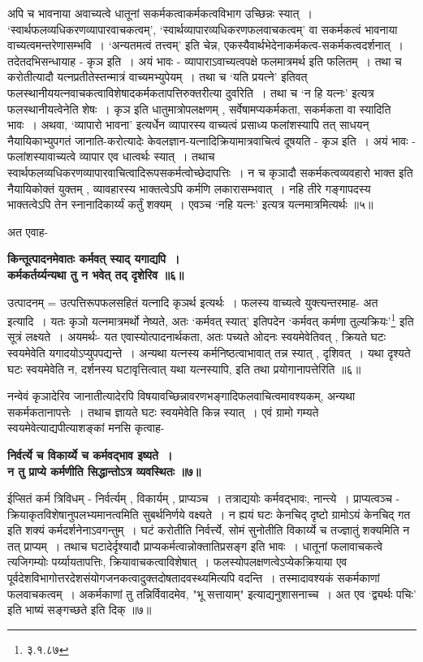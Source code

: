 अपि च भावनाया अवाच्यत्वे धातूनां सकर्मकत्वाकर्मकत्वविभाग उच्छिन्नः स्यात्~।
`स्वार्थफलव्यधिकरणव्यापारवाचकत्वम्', `स्वार्थव्यापारव्यधिकरणफलवाचकत्वम्' वा सकर्मकत्वं भावनाया वाच्यत्वमन्तरेणासम्भवि~।
`अन्यतमत्वं तत्त्वम्' इति चेन्न, एकस्यैवार्थभेदेनाकर्मकत्व-सकर्मकत्वदर्शनात्~।
तदेतदभिसन्धायाह - कृञ इति~।
अयं भावः - व्यापाराऽवाच्यत्वपक्षे फलमात्रमर्थ इति फलितम्~।
तथा च करोतीत्यादौ यत्नप्रतीतेस्तन्मात्रं वाच्यमभ्युपेयम्~।
तथा च `यति प्रयत्ने' इतिवत् फलस्थानीययत्नवाचकत्वाविशेषादकर्मकतापत्तिरुक्तरीत्या दुर्वारेति~।
तथा च `न हि यत्नः' इत्यत्र फलस्थानीयत्वेनेति शेषः~।
कृञ इति धातुमात्रोपलक्षणम् , सर्वेषामप्यकर्मकता, सकर्मकता वा स्यादिति भावः~।
 अथवा, `व्यापारो भावना' इत्यर्धेन व्यापारस्य वाच्यत्वं प्रसाध्य फलांशस्यापि तत् साधयन् नैयायिकाभ्युपगतं जानाति-करोत्यादेः केवलज्ञान-यत्नादिक्रियामात्रवाचित्वं दूषयति - कृञ इति~।
अयं भावः - फलांशस्यावाच्यत्वे व्यापार एव धात्वर्थः स्यात्~।
तथाच स्वार्थफलव्यधिकरणव्यापारवाचित्वादिरूपसकर्मत्वोच्छेदापत्तिः~।
न च कृञादौ सकर्मकत्वव्यवहारो भाक्त इति नैयायिकोक्तं युक्तम् , व्यावहारस्य भाक्तत्वेऽपि कर्मणि लकारासम्भवात्~।
नहि तीरे गङ्गापदस्य भाक्तत्वेऽपि तेन स्नानादिकार्य्यं कर्तुं शक्यम्~।
एवञ्च `नहि यत्नः' इत्यत्र यत्नमात्रमित्यर्थः ॥५॥\par
अत एवाह-
\begin{center} 
{\bfseries किन्तूत्पादनमेवातः कर्मवत् स्याद् यगाद्यपि~।\\
 कर्मकर्तर्य्यन्यथा तु न भवेत् तद् दृशेरिव ॥६॥}
\end{center}
उत्पादनम् = उत्पत्तिरूपफलसहितं यत्नादि कृञर्थ इत्यर्थः~।
फलस्य वाच्यत्वे युक्त्यन्तरमाह- अत इत्यादि~।
यतः कृञो यत्नमात्रमर्थो नेष्यते, अतः `कर्मवत् स्यात्' इतिपदेन `कर्मवत् कर्मणा तुल्यक्रियः'\footnote{३.१.८७} इति सूत्रं लक्ष्यते~।
अयमर्थः- यत एवास्योत्पादनार्थकता, अतः पच्यते ओदनः स्वयमेवेतिवत् , क्रियते घटः स्वयमेवेति यगादयोऽप्युपपद्यन्ते~।
अन्यथा यत्नस्य कर्मनिष्ठत्वाभावात् तन्न स्यात् , दृशिवत्~।
यथा दृश्यते घटः स्वयमेवेति न, दर्शनस्य घटावृत्तित्वात् यथा यत्नस्यापि, इति तथा प्रयोगानापत्तेरिति ॥६॥\par
नन्वेवं कृञादेरिव जानातीत्यादेरपि विषयावच्छिन्नावरणभङ्गादिफलवाचित्वमावश्यकम्, अन्यथा सकर्मकतानापत्तेः~।
तथाच ज्ञायते घटः स्वयमेवेति किन्न स्यात्~।
एवं ग्रामो गम्यते स्वयमेवेत्याद्यपीत्याशङ्कां मनसि कृत्वाह-
\begin{center}{\bfseries निर्वर्त्ये च विकार्य्ये च कर्मवद्भाव इष्यते~।\\
 न तु प्राप्ये कर्मणीति सिद्धान्तोऽत्र व्यवस्थितः ॥७॥}
\end{center}
 ईप्सितं कर्म त्रिविधम् - निर्वर्त्यम् , विकार्यम् , प्राप्यञ्च~।
तत्राद्ययोः कर्मवद्भावः, नान्त्ये~।
प्राप्यत्वञ्च - क्रियाकृतविशेषानुपलभ्यमानत्वमिति सुबर्थनिर्णये वक्ष्यते~।
न ह्ययं घटः केनचिद् दृष्टो ग्रामोऽयं केनचिद् गत इति शक्यं कर्मदर्शनेनाऽवगन्तुम्~।
घटं करोतीति निर्वर्त्त्ये, सोमं सुनोतीति विकार्य्ये च तज्ज्ञातुं शक्यमिति न तत् प्राप्यम्~।
तथाच घटादेर्दृश्यादौ प्राप्यकर्मत्वान्नोक्तातिप्रसङ्ग इति भावः~।
धातूनां फलावाचकत्वे त्यजिगम्योः पर्य्यायतापत्तिः, क्रियावाचकत्वाविशेषात्~।
फलस्योपलक्षणत्वेऽप्येकक्रियाया एव पूर्वदेशविभागोत्तरदेशसंयोगजनकत्वादुक्तदोषतादवस्थ्यमित्यपि वदन्ति~।
तस्मादावश्यकं सकर्मकाणां फलवाचकत्वम्~।
अकर्मकाणां तु तन्निर्विवादमेव, "भू सत्तायाम्" इत्याद्यनुशासनाच्च~।
अत एव `द्व्यर्थः पचिः' इति भाष्यं सङ्गच्छते इति दिक् ॥७॥\par


